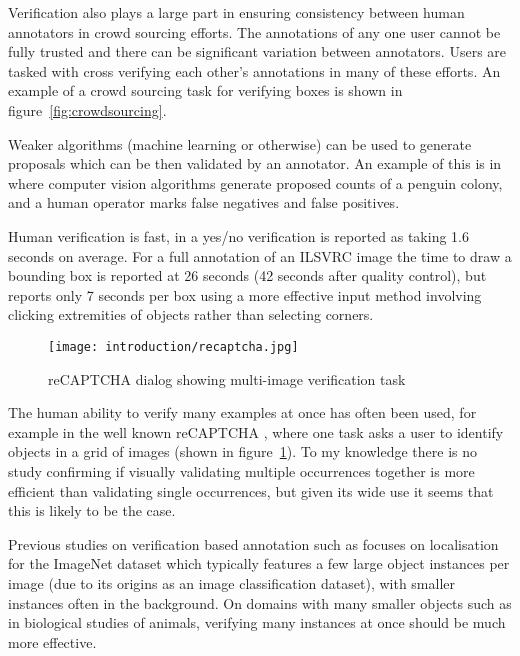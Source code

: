 Verification also plays a large part in ensuring consistency between human annotators in crowd sourcing efforts. The annotations of any one user cannot be fully trusted and there can be significant variation between annotators. Users are tasked with cross verifying each other's annotations in many of these efforts. An example of a crowd sourcing task \cite{Su2012a} for verifying boxes is shown in figure~\ref{fig:crowdsourcing}.

Weaker algorithms (machine learning or otherwise) can be used to generate proposals which can be then validated by an annotator. An example of this is in \cite{McNeill2011} where computer vision algorithms generate proposed counts of a penguin colony, and a human operator marks false negatives and false positives.

Human verification is fast, in \cite{Papadopoulos2016} a yes/no verification is reported as taking 1.6 seconds on average. For a full annotation of an \gls{ILSVRC} image \cite {Su2012a} the time to draw a bounding box is reported at 26 seconds (42 seconds after quality control), but \cite{Papadopoulos2017} reports only 7 seconds per box using a more effective input method involving clicking extremities of objects rather than selecting corners. 

\begin{figure}[h]
  \centering
  \texttt{[image: introduction/recaptcha.jpg]}
  \caption{reCAPTCHA dialog showing multi-image verification task}  
  \label{fig:captcha}
\end{figure}

The human ability to verify many examples at once has often been used, for example in the well known reCAPTCHA \cite{von2008recaptcha}, where one task asks a user to identify objects in a grid of images (shown in figure~\ref{fig:captcha}). To my knowledge there is no study confirming if visually validating multiple occurrences together is more efficient than validating single occurrences, but given its wide use it seems that this is likely to be the case.

Previous studies on verification based annotation such as \cite{Papadopoulos2016} focuses on localisation for the ImageNet dataset which typically features a few large object instances per image (due to its origins as an image classification dataset), with smaller instances often in the background. On domains with many smaller objects such as in biological studies of animals, verifying many instances at once should be much more effective. 


